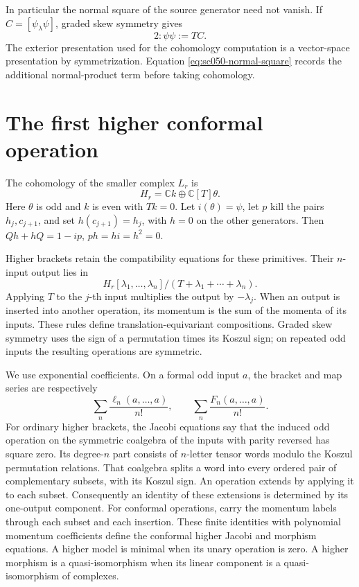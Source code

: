 In particular the normal square of the source generator need not
vanish. If \(C=[\psi_\lambda\psi]\), graded skew symmetry gives
\begin{equation}\label{eq:sc050-normal-square}
 2:\psi\psi:=TC.
\end{equation}
The exterior presentation used for the cohomology computation is a
vector-space presentation by symmetrization. Equation
\eqref{eq:sc050-normal-square} records the additional normal-product
term before taking cohomology.

\section{The first higher conformal operation}
\label{sec:sc050-higher}

The cohomology of the smaller complex \(L_r\) is
\[
 H_r=\mathbb Ck\oplus\mathbb C[T]\theta.
\]
Here \(\theta\) is odd and \(k\) is even with \(Tk=0\).
Let \(i(\theta)=\psi\), let \(p\) kill the pairs \(h_j,c_{j+1}\),
and set \(h(c_{j+1})=h_j\), with \(h=0\) on the other generators.
Then \(Qh+hQ=1-ip\), \(ph=hi=h^2=0\).

Higher brackets retain the compatibility equations for these
primitives. Their \(n\)-input output lies in
\[
 H_r[\lambda_1,\ldots,\lambda_n]/
       (T+\lambda_1+\cdots+\lambda_n).
\]
Applying \(T\) to the \(j\)-th input multiplies the output by
\(-\lambda_j\). When an output is inserted into another operation,
its momentum is the sum of the momenta of its inputs. These rules
define translation-equivariant compositions. Graded skew symmetry
uses the sign of a permutation times its Koszul sign; on repeated
odd inputs the resulting operations are symmetric.

We use exponential coefficients. On a formal odd input \(a\),
the bracket and map series are respectively
\[
 \sum_n\frac{\ell_n(a,\ldots,a)}{n!},\qquad
 \sum_n\frac{F_n(a,\ldots,a)}{n!}.
\]
For ordinary higher brackets, the Jacobi equations say that
the induced odd operation on the symmetric coalgebra of the
inputs with parity reversed has square zero. Its degree-\(n\)
part consists of \(n\)-letter tensor words modulo the Koszul
permutation relations.
That coalgebra splits a word into every ordered pair of complementary
subsets, with its Koszul sign. An operation extends by applying it
to each subset. Consequently an identity of these extensions is
determined by its one-output component. For conformal operations,
carry the momentum labels through each subset and each insertion.
These finite identities with polynomial momentum coefficients
define the conformal higher Jacobi and morphism equations.
A higher model is minimal when its unary operation is zero.
A higher morphism is a quasi-isomorphism when its linear
component is a quasi-isomorphism of complexes.

